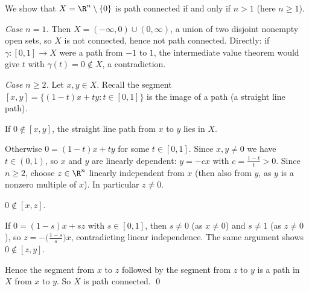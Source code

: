 
We show that $X=\R^n\setminus\{0\}$ is path connected if and only if $n>1$ (here $n\ge 1$).

\emph{Case $n=1$.} Then $X=(-\infty,0)\cup(0,\infty)$, a union of two disjoint nonempty open
sets, so $X$ is not connected, hence not path connected. Directly: if
$\gamma\colon[0,1]\to X$ were a path from $-1$ to $1$, the intermediate value theorem would give
$t$ with $\gamma(t)=0\notin X$, a contradiction.

\emph{Case $n\ge 2$.} Let $x,y\in X$. Recall the segment
$[x,y]=\{(1-t)x+ty : t\in[0,1]\}$ is the image of a path (a straight line path).

If $0\notin[x,y]$, the straight line path from $x$ to $y$ lies in $X$.

Otherwise $0=(1-t)x+ty$ for some $t\in[0,1]$. Since $x,y\neq 0$ we have $t\in(0,1)$, so $x$ and
$y$ are linearly dependent: $y=-cx$ with $c=\frac{1-t}{t}>0$. Since $n\ge 2$, choose
$z\in\R^n$ linearly independent from $x$ (then also from $y$, as $y$ is a nonzero multiple of
$x$). In particular $z\neq 0$.

\begin{claim}
$0\notin[x,z]$.
\end{claim}
If $0=(1-s)x+sz$ with $s\in[0,1]$, then $s\neq 0$ (as $x\neq 0$) and $s\neq 1$ (as $z\neq 0$),
so $z=-\bigl(\frac{1-s}{s}\bigr)x$, contradicting linear independence. The same argument shows
$0\notin[z,y]$.

Hence the segment from $x$ to $z$ followed by the segment from $z$ to $y$ is a path in $X$ from
$x$ to $y$. So $X$ is path connected. \qed
